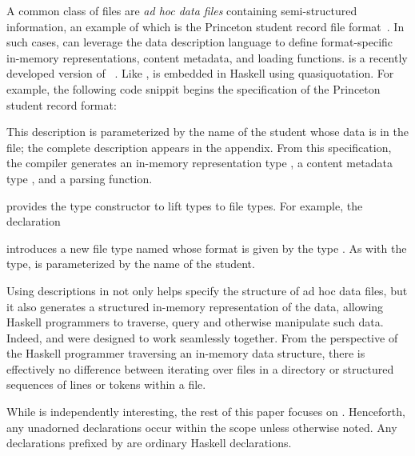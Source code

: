 A common class of files are \textit{ad hoc data files} containing
semi-structured information, an example of which is the Princeton
student record file format~\cite{pldi-aux-materials}. 
In such cases, \forest{} can leverage the \padshaskell{} data
description language to define format-specific in-memory
representations, content metadata, and loading functions. 
\padshaskell{} is a recently developed version of 
\pads{}~\cite{fisher+:pads,fisher+:toplas,mandelbaum+:pads-ml}.
Like \forest{}, \padshaskell{} is embedded in Haskell using
quasiquotation.  For example, the following code snippit 
begins the \pads{} specification of the Princeton student record
format: 
\noindent
\begin{code}
[pads| 
  \kw{data} Student (name :: String) = < pads decl >
|]
\end{code}
This description is parameterized by the name of the student whose
data is in the file; the complete description appears in the appendix.
From this specification, the \pads{} compiler
generates an in-memory representation type , a content metadata
type , and a parsing function.  

\forest{} provides the  type constructor to lift \pads{}
types to \forest{} file types.  For example, the declaration
\begin{code}
[forest| 
  \kw{type} SFile (n::String) = File (Student n) 
|]
\end{code}
introduces a new file type named  whose format is given by
the \pads{} type .  As with the \pads{} type, 
is parameterized by the name of the student.  

Using \padshaskell{} descriptions in \forest{} not only helps specify
the structure of ad hoc data files, but it also generates a structured
in-memory representation of the data, allowing Haskell programmers to
traverse, query and otherwise manipulate such data.  Indeed,
\padshaskell{} and \forest{} were designed to work seamlessly
together.  From the perspective of the Haskell programmer traversing
an in-memory data structure, there is effectively no difference
between iterating over files in a directory or structured sequences of
lines or tokens within a file.

While \padshaskell{} is independently interesting,
the rest of this paper focuses on \forest{}.  Henceforth, any
unadorned declarations occur within the \forest{} scope
\cd{[forest|...|]} unless otherwise noted.  Any declarations prefixed
by \cd{>} 
are ordinary Haskell declarations.

